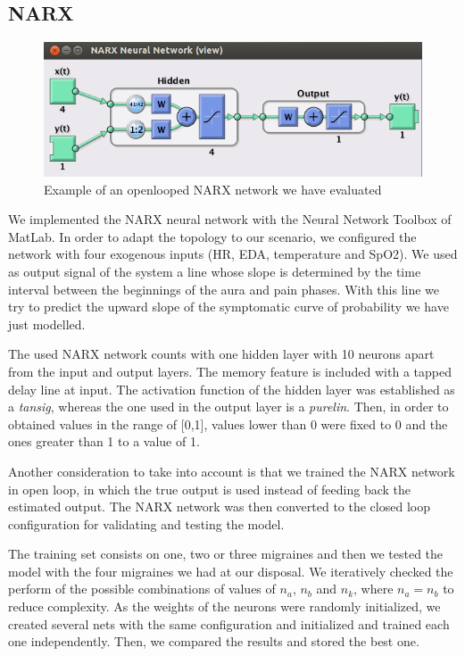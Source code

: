 \subsection{NARX}
\label{subsec:narxapplication}



\begin{figure}[!ht]
\centering
\includegraphics[width=0.9\columnwidth]{images/results/narxOpenloop}
\caption{Example of an openlooped NARX network we have evaluated}
\label{fig:narxopenloop}
\end{figure}


We implemented the NARX neural network with the Neural Network 
Toolbox of MatLab. In order to adapt the topology to our scenario, 
we configured the network with four exogenous inputs (HR, EDA, 
temperature and SpO2). We used as output signal of the system a line 
whose slope is determined by the time interval between the 
beginnings of the aura and pain phases. With this line we try to 
predict the upward slope of the symptomatic curve of probability we 
have just modelled. 

The used NARX network counts with one hidden layer with 10 
neurons apart from the input and output layers. 
The memory feature is included with a tapped delay line at input. 
The activation function of the hidden layer was established as 
a \textit{tansig}, whereas the one used in the output layer is 
a \textit{purelin}. Then, in order to obtained values in the range of [0,1], values lower than 0 were fixed to 0 and the ones greater than 1 to a value of 1.

Another consideration to take into account is that we trained the 
NARX network in open loop, in which the true output is used instead 
of feeding back the estimated output. The NARX network was then 
converted to the closed loop configuration for validating and 
testing the model.

The training set consists on one, two or three migraines and then we tested the model with the four migraines we had at our disposal. 
We iteratively checked the perform  
of the possible combinations of values of 
$n_{a}$, $n_{b}$ and $n_{k}$, where $n_{a} = n_{b}$ to reduce
complexity. As the weights of the neurons were randomly initialized,
we created several nets with the same configuration and initialized
and trained each one independently. Then, we compared the results
and stored the best one.


